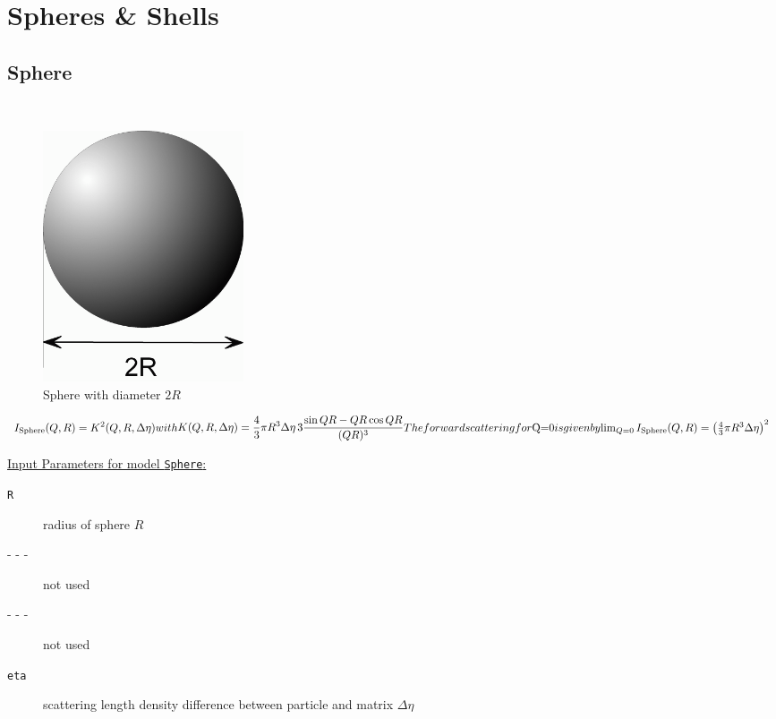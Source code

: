 \section{Spheres \& Shells}
\label{sect:Spheres_Shells}

\subsection{Sphere}
\label{sect:sphere} ~\\

\begin{figure}[htb]
\begin{center}
\includegraphics[width=0.2875\textwidth,height=0.359\textwidth]{../images/form_factor/spheres/sphere.png}
\end{center}
\caption{Sphere with diameter $2R$} \label{fig:Sketch_sphere}
\end{figure}

\begin{subequations}
\begin{align}
I_\text{Sphere}(Q,R) = K^2(Q,R,\Delta\eta) \label{eq:I_sphere}
\end{align}
with
\begin{align}
 K(Q,R,\Delta\eta) = \frac{4}{3}\pi R^3 \Delta\eta \, 3 \frac{\sin QR - QR \cos QR}{(QR)^3}
\end{align}
The forward scattering for $Q=0$ is given by
$$
\lim_{Q=0}I_\text{Sphere}(Q,R) =\left( \frac{4}{3}\pi R^3 \Delta\eta \right)^2
$$
\end{subequations}

\vspace{5mm}
\noindent \underline{Input Parameters for model \texttt{Sphere}:}
\begin{description}
\item[\texttt{R}] radius of sphere $R$
\item[- - -] not used
\item[- - -] not used
\item[\texttt{eta}] scattering length density difference between particle and matrix $\Delta\eta$
\end{description}

